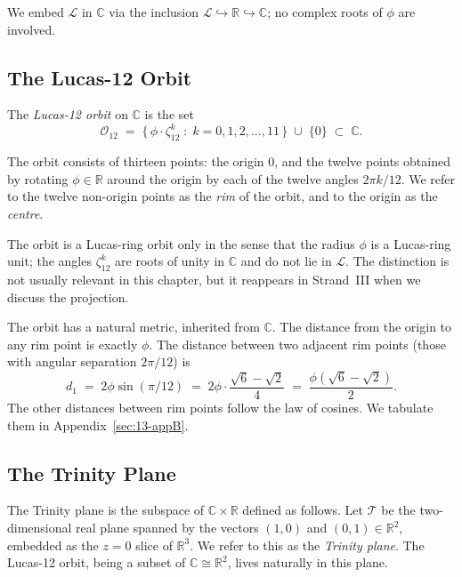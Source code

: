 We embed $\mathcal{L}$ in $\mathbb{C}$ via the inclusion
$\mathcal{L} \hookrightarrow \mathbb{R} \hookrightarrow \mathbb{C}$;
no complex roots of $\phi$ are involved.

\subsection{The Lucas-12 Orbit}
\label{sec:13-lucas-12-orbit}

\begin{definition}
\label{def:13-lucas-12}
The \emph{Lucas-12 orbit} on $\mathbb{C}$ is the set
\[
  \mathcal{O}_{12} \;=\; \bigl\{\, \phi \cdot \zeta_{12}^{k} \;:\;
    k = 0, 1, 2, \ldots, 11 \,\bigr\} \;\cup\; \{0\} \;\subset\;
    \mathbb{C}.
\]
\end{definition}

The orbit consists of thirteen points: the origin $0$, and the
twelve points obtained by rotating $\phi \in \mathbb{R}$ around the
origin by each of the twelve angles $2\pi k / 12$. We refer to the
twelve non-origin points as the \emph{rim} of the orbit, and to the
origin as the \emph{centre}.

\begin{remark}
The orbit is a Lucas-ring orbit only in the sense that the radius
$\phi$ is a Lucas-ring unit; the angles $\zeta_{12}^{k}$ are roots
of unity in $\mathbb{C}$ and do not lie in $\mathcal{L}$. The
distinction is not usually relevant in this chapter, but it
reappears in Strand~III when we discuss the projection.
\end{remark}

The orbit has a natural metric, inherited from $\mathbb{C}$. The
distance from the origin to any rim point is exactly $\phi$. The
distance between two adjacent rim points (those with angular
separation $2\pi / 12$) is
\[
  d_{1} \;=\; 2\phi \sin(\pi/12)
       \;=\; 2\phi \cdot \frac{\sqrt{6} - \sqrt{2}}{4}
       \;=\; \frac{\phi(\sqrt{6} - \sqrt{2})}{2}.
\]
The other distances between rim points follow the law of cosines.
We tabulate them in Appendix~\ref{sec:13-appB}.

\subsection{The Trinity Plane}
\label{sec:13-trinity-plane}

The Trinity plane is the subspace of $\mathbb{C} \times \mathbb{R}$
defined as follows. Let $\mathcal{T}$ be the two-dimensional real
plane spanned by the vectors $(1, 0)$ and $(0, 1) \in \mathbb{R}^{2}$,
embedded as the $z = 0$ slice of $\mathbb{R}^{3}$. We refer to this
as the \emph{Trinity plane}. The Lucas-12 orbit, being a subset of
$\mathbb{C} \cong \mathbb{R}^{2}$, lives naturally in this plane.

